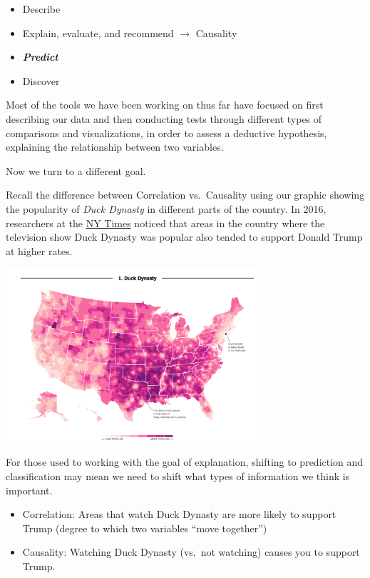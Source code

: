 \documentclass[
  letterpaper,
  DIV=11,
  numbers=noendperiod]{scrreprt}
\providecommand{\tightlist}{%
  \setlength{\itemsep}{0pt}\setlength{\parskip}{0pt}}\usepackage{longtable,booktabs,array}
\begin{document}
\begin{itemize}
\tightlist
\item
  Describe
\item
  Explain, evaluate, and recommend \(\rightarrow\) Causality
\item
  \textbf{\emph{Predict}}
\item
  Discover
\end{itemize}

Most of the tools we have been working on thus far have focused on first
describing our data and then conducting tests through different types of
comparisons and visualizations, in order to assess a deductive
hypothesis, explaining the relationship between two variables.

Now we turn to a different goal.

Recall the difference between Correlation vs.~Causality using our
graphic showing the popularity of \emph{Duck Dynasty} in different parts
of the country. In 2016, researchers at the
\href{https://www.nytimes.com/interactive/2016/12/26/upshot/duck-dynasty-vs-modern-family-television-maps.html}{NY
Times} noticed that areas in the country where the television show Duck
Dynasty was popular also tended to support Donald Trump at higher rates.

\includegraphics[width=0.7\textwidth,height=\textheight]{images/duckdynasty.png}

For those used to working with the goal of explanation, shifting to
prediction and classification may mean we need to shift what types of
information we think is important.

\begin{itemize}
\tightlist
\item
  Correlation: Areas that watch Duck Dynasty are more likely to support
  Trump (degree to which two variables ``move together'')
\item
  Causality: Watching Duck Dynasty (vs.~not watching) causes you to
  support Trump.
\end{itemize}
\end{document}
